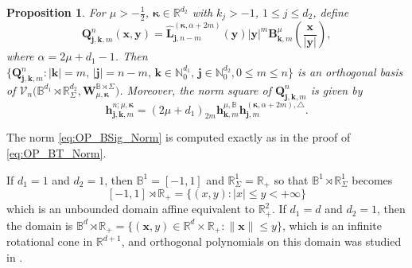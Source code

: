 \documentclass{amsart}
\newtheorem{prop}[thm]{Proposition}
\theoremstyle{remark}
\def\la{{\langle}}
\def\ra{{\rangle}}
\def\a{{\alpha}}
\def\la{{\langle}}
\def\ra{{\rangle}}
\def\xb{{\bm x}}
\def\Lb{{\bm L}}
\def\Qb{{\bm Q}}
\def\CV{{\mathcal V}}
\def\BB{{\mathbb B}}
\def\NN{{\mathbb N}}
\def\RR{{\mathbb R}}
\def\bk{{\boldsymbol{\kappa}}}
\def\f{\frac}
\begin{document}
\begin{prop}
For $\mu > - \f12$, $\bk \in \RR^{d_2}$ with $k_j > -1$, $1 \le j \le d_2$, define 
\begin{equation} \label{eq:OP_BSig}
 \bm Q_{\bm j, \bm k, m}^n(\bm x,\bm y) = \hat \Lb_{\bm j, n-m}^{(\bk, \alpha+2m)}(\bm y) |\bm y|^m 
      \bm B_{\bm k, m}^\mu \left(\frac{\bm x}{|\bm y|}\right),
\end{equation}
where $\alpha = 2 \mu + d_1-1$. Then
$\{\bm Q_{\bm j, \bm k, m}^n: |\bm k| = m, \, |\bm j| = n-m, \, \bm k \in \NN_0^{d_1}, \, \bm j \in \NN_0^{d_2}, 0\le m \le n\}$ 
is an orthogonal basis of $\CV_n\big(\BB^{d_1}\!\! \rtimes \RR_\Sigma^{d_2}, \bm W_{\mu, \bk}^{\BB\rtimes \Sigma}\big)$. 
Moreover, the norm square of $\bm Q_{\bm j, \bm k, m}^n$ is given by 
\begin{equation} \label{eq:OP_BSig_Norm}
   \bm h_{\bm j, \bm k, m}^{n; \mu,\bk}  %
       =  (2\mu+d_1)_{2m} \bm h_{\bm k,m}^{\mu, \BB}  
       \bm h_{\bm j,m}^{(\bk, \a+2m), \triangle}. 
\end{equation}
\end{prop}
  
The norm \eqref{eq:OP_BSig_Norm} is computed exactly as in the proof of \eqref{eq:OP_BT_Norm}.  

If $d_1 =1$ and $d_2 =1$, then $\BB^1 = [-1,1]$ and $\RR_\Sigma^1 = \RR_+$ so that 
$\BB^1 \rtimes \RR_\Sigma^1$ becomes
$$
       [-1,1] \rtimes \RR_+ = \{(x,y): |x| \le y < + \infty\}
$$
which is an unbounded domain affine equivalent to $\RR_+^2$. If $d_1 = d$ and $d_2 =1$, then the
domain is $\BB^{d} \rtimes \RR_+ = \{(\xb, y) \in \RR^d \times \RR_+: \|\xb\| \le y\}$, which is an infinite
rotational cone in $\RR^{d+1}$, and orthogonal polynomials on this domain was studied in \cite{X20}. 
\end{document}
